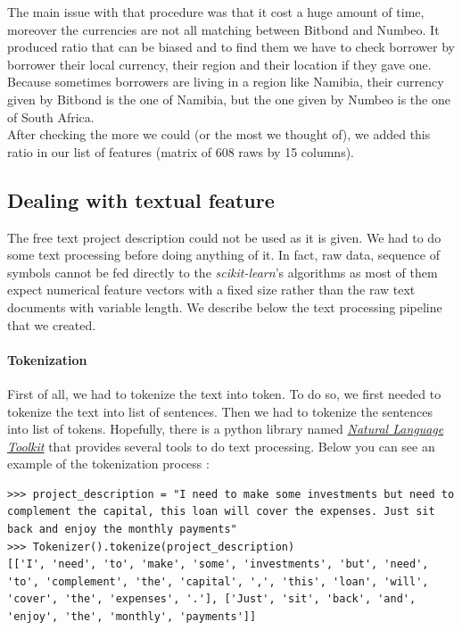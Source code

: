 		The main issue with that procedure was that it cost a huge amount of time, moreover the currencies are not all matching between Bitbond and Numbeo. It produced ratio that can be biased and to find them we have to check borrower by borrower their local currency, their region and their location if they gave one. Because sometimes borrowers are living in a region like Namibia, their currency given by Bitbond is the one of Namibia, but the one given by Numbeo is the one of South Africa.\\

		After checking the more we could (or the most we thought of), we added this ratio in our list of features (matrix of 608 raws by 15 columns).

	\subsection{Dealing with textual feature}
		The free text project description could not be used as it is given. We had to do some text processing before doing anything of it. In fact, raw data, sequence of symbols cannot be fed directly to the \textit{scikit-learn}'s algorithms as most of them expect numerical feature vectors with a fixed size rather than the raw text documents with variable length. We describe below the text processing pipeline that we created.

		\paragraph{Tokenization}
			First of all, we had to tokenize the text into token. To do so, we first needed to tokenize the text into list of sentences. Then we had to tokenize the sentences into list of tokens. Hopefully, there is a python library named \href{http://www.nltk.org/}{\textit{Natural Language Toolkit}} that provides several tools to do text processing. Below you can see an example of the tokenization process :
			\begin{verbatim}
>>> project_description = "I need to make some investments but need to complement the capital, this loan will cover the expenses. Just sit back and enjoy the monthly payments"
>>> Tokenizer().tokenize(project_description)
[['I', 'need', 'to', 'make', 'some', 'investments', 'but', 'need', 'to', 'complement', 'the', 'capital', ',', 'this', 'loan', 'will', 'cover', 'the', 'expenses', '.'], ['Just', 'sit', 'back', 'and', 'enjoy', 'the', 'monthly', 'payments']]
			\end{verbatim}

